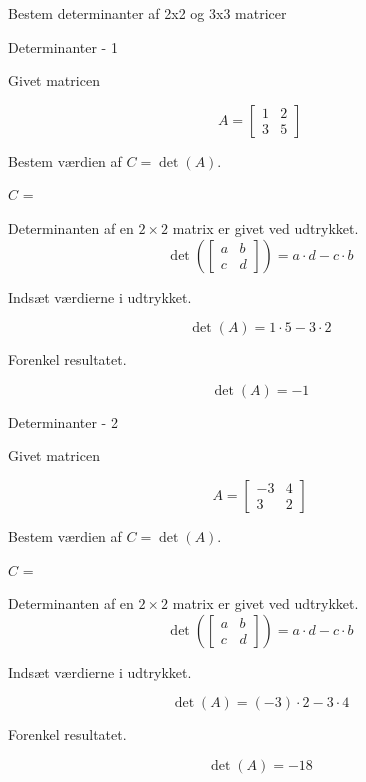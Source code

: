 \documentclass{article}
\begin{document}
Bestem determinanter af 2x2 og 3x3 matricer
\tableofcontents
\newpage

\begin{exercise}{Determinanter - 1}

Givet matricen

\[
A = \left[\begin{array}{rr}
1 & 2 \\ 
3 & 5 
\end{array} \right]
\]

Bestem værdien af $C = \det(A)$.

$C$ = 

\hint
Determinanten af en $2 \times 2$ matrix er givet ved udtrykket.
\[
\det \left( \left[\begin{array}{rr}
a & b \\ 
c & d 
\end{array} \right] \right) = a \cdot d - c \cdot b
\]

\hint
Indsæt værdierne i udtrykket.

\hint
\[
\det \left( A \right) = 1 \cdot 5 - 3 \cdot 2
\]

\hint
Forenkel resultatet.

\hint
\[
\det \left( A \right) = -1
\]

\end{exercise}


\begin{exercise}{Determinanter - 2}

Givet matricen

\[
A = \left[\begin{array}{rr}
-3 & 4 \\ 
3 & 2 
\end{array} \right]
\]

Bestem værdien af $C = \det(A)$.

$C$ = 

\hint
Determinanten af en $2 \times 2$ matrix er givet ved udtrykket.
\[
\det \left( \left[\begin{array}{rr}
a & b \\ 
c & d 
\end{array} \right] \right) = a \cdot d - c \cdot b
\]

\hint
Indsæt værdierne i udtrykket.

\hint
\[
\det \left( A \right) = (-3) \cdot 2 - 3 \cdot 4
\]

\hint
Forenkel resultatet.

\hint
\[
\det \left( A \right) = -18
\]

\end{exercise}
\end{document}
